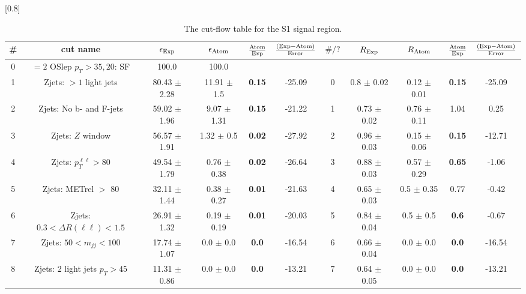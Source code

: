 \documentclass[12pt]{article}
\begin{document}
\renewcommand{\arraystretch}{1.3}
\begin{table}[h!]
\begin{center}
\scalebox{0.7}[0.8]{ 
\begin{tabular}{c|c||c|c|>{\columncolor{yellow}}c|c||c|c|c|>{\columncolor{yellow}}c|c}
\hline
\# & cut name & $\epsilon_{\rm Exp}$ & $\epsilon_{\rm Atom}$ & $\frac{\rm Atom}{\rm Exp}$ & $\frac{({\rm Exp} - {\rm Atom})}{\rm Error}$ & $\#/?$ & $R_{\rm Exp}$ & $R_{\rm Atom}$ & $\frac{\rm Atom}{\rm Exp}$ & $\frac{({\rm Exp} - {\rm Atom})}{\rm Error}$ \\
\hline
0 & $= 2$ OSlep $p_T > 35, 20$: SF & 100.0   & 100.0   &  &  &  &   &   &  &  \\
1 & \cellcolor{magenta} Zjets: $> 1$ light jets & 80.43 $\pm$ 2.28 & 11.91 $\pm$ 1.5 & \color{red}\bf 0.15 & -25.09 & 0 & 0.8 $\pm$ 0.02 & 0.12 $\pm$ 0.01 & \color{red}\bf 0.15 & -25.09 \\
2 & Zjets: No b- and F-jets & 59.02 $\pm$ 1.96 & 9.07 $\pm$ 1.31 & \color{red}\bf 0.15 & -21.22 & 1 & 0.73 $\pm$ 0.02 & 0.76 $\pm$ 0.11 & 1.04 & 0.25 \\
3 & \cellcolor{magenta} Zjets: $Z$ window & 56.57 $\pm$ 1.91 & 1.32 $\pm$ 0.5 & \color{red}\bf 0.02 & -27.92 & 2 & 0.96 $\pm$ 0.03 & 0.15 $\pm$ 0.06 & \color{red}\bf 0.15 & -12.71 \\
4 & \cellcolor{cyan} Zjets: $p_T^{\ell \ell} > 80$ & 49.54 $\pm$ 1.79 & 0.76 $\pm$ 0.38 & \color{red}\bf 0.02 & -26.64 & 3 & 0.88 $\pm$ 0.03 & 0.57 $\pm$ 0.29 & \color{blue}\bf 0.65 & -1.06 \\
5 & Zjets: METrel $>$ 80 & 32.11 $\pm$ 1.44 & 0.38 $\pm$ 0.27 & \color{red}\bf 0.01 & -21.63 & 4 & 0.65 $\pm$ 0.03 & 0.5 $\pm$ 0.35 & 0.77 & -0.42 \\
6 & \cellcolor{cyan} Zjets: $0.3 < \Delta R (\ell \ell) < 1.5$ & 26.91 $\pm$ 1.32 & 0.19 $\pm$ 0.19 & \color{red}\bf 0.01 & -20.03 & 5 & 0.84 $\pm$ 0.04 & 0.5 $\pm$ 0.5 & \color{blue}\bf 0.6 & -0.67 \\
7 & \cellcolor{magenta} Zjets: $50 < m_{jj} < 100$ & 17.74 $\pm$ 1.07 & 0.0 $\pm$ 0.0 & \color{red}\bf 0.0 & -16.54 & 6 & 0.66 $\pm$ 0.04 & 0.0 $\pm$ 0.0 & \color{red}\bf 0.0 & -16.54 \\
8 & \cellcolor{magenta} Zjets: 2 light jets $p_T > 45$ & 11.31 $\pm$ 0.86 & 0.0 $\pm$ 0.0 & \color{red}\bf 0.0 & -13.21 & 7 & 0.64 $\pm$ 0.05 & 0.0 $\pm$ 0.0 & \color{red}\bf 0.0 & -13.21 \\
\hline
\end{tabular}
}
\caption{\small 
        The cut-flow table for the S1 signal region.
    }
\label{tab:cflow_Zjets_350}
\end{center}
\label{default}
\end{table}

        
        
\end{document}
